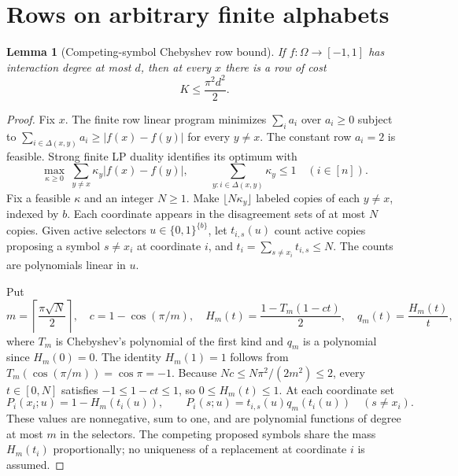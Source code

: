 \documentclass[11pt]{article}
\numberwithin{equation}{section}
\newtheorem{lemma}[theorem]{Lemma}
\theoremstyle{remark}
\newcommand{\delt}{\Delta}
\begin{document}
\section{Rows on arbitrary finite alphabets}\label{sec:rows}
\begin{lemma}[Competing-symbol Chebyshev row bound]\label{lem:rowcost}
If $f:\Omega\to[-1,1]$ has interaction degree at most $d$, then at every $x$ there is a row of cost
\begin{equation}\label{eq:K}
 K\le\frac{\pi^2d^2}{2}.
\end{equation}
\end{lemma}
\begin{proof}
Fix $x$. The finite row linear program minimizes $\sum_i a_i$ over $a_i\ge0$ subject to
$\sum_{i\in\delt(x,y)}a_i\ge|f(x)-f(y)|$ for every $y\ne x$. The constant row $a_i=2$ is feasible. Strong finite LP duality identifies its optimum with
\begin{equation}\label{eq:dual}
 \max_{\kappa\ge0}\ \sum_{y\ne x}\kappa_y|f(x)-f(y)|,
 \qquad \sum_{y:i\in\delt(x,y)}\kappa_y\le1\quad(i\in[n]).
\end{equation}
Fix a feasible $\kappa$ and an integer $N\ge1$. Make $\lfloor N\kappa_y\rfloor$ labeled copies of each $y\ne x$, indexed by $b$. Each coordinate appears in the disagreement sets of at most $N$ copies. Given active selectors $u\in\{0,1\}^{\{b\}}$, let $t_{i,s}(u)$ count active copies proposing a symbol $s\ne x_i$ at coordinate $i$, and $t_i=\sum_{s\ne x_i}t_{i,s}\le N$. The counts are polynomials linear in $u$.

Put
\begin{equation}\label{eq:selector}
 m=\left\lceil\frac{\pi\sqrt N}{2}\right\rceil,\quad c=1-\cos(\pi/m),\quad
 H_m(t)=\frac{1-T_m(1-ct)}2,\quad q_m(t)=\frac{H_m(t)}t,
\end{equation}
where $T_m$ is Chebyshev's polynomial of the first kind and $q_m$ is a polynomial since $H_m(0)=0$. The identity $H_m(1)=1$ follows from $T_m(\cos(\pi/m))=\cos\pi=-1$. Because
$Nc\le N\pi^2/(2m^2)\le2$, every $t\in[0,N]$ satisfies $-1\le1-ct\le1$, so $0\le H_m(t)\le1$. At each coordinate set
\begin{equation}\label{eq:probselector}
 P_i(x_i;u)=1-H_m(t_i(u)),\qquad
 P_i(s;u)=t_{i,s}(u)q_m(t_i(u))\quad(s\ne x_i).
\end{equation}
These values are nonnegative, sum to one, and are polynomial functions of degree at most $m$ in the selectors. The competing proposed symbols share the mass $H_m(t_i)$ proportionally; no uniqueness of a replacement at coordinate $i$ is assumed.


\end{proof}
\end{document}
